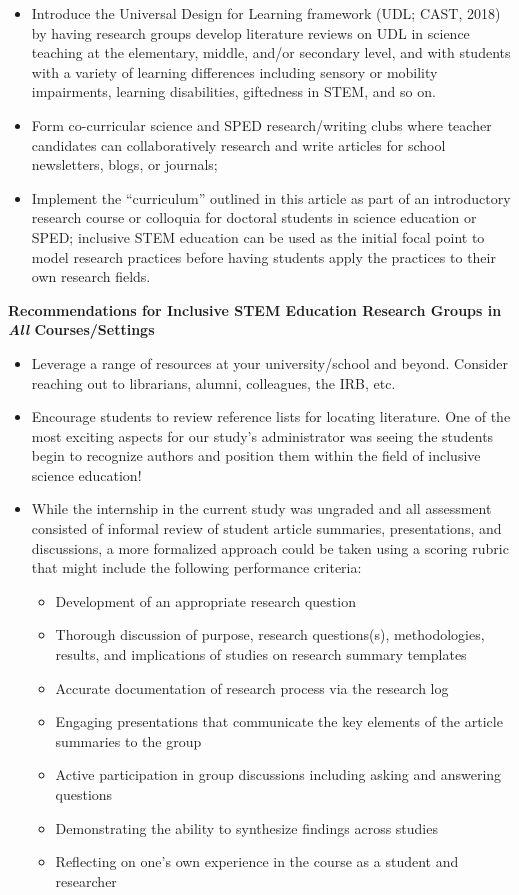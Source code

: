 \documentclass[11.5pt]{sig-alternate}
\begin{document}
\begin{large}
\begin{itemize}
     \item Introduce the Universal Design for Learning framework (UDL; CAST, 2018) by having research groups develop literature reviews on UDL in science teaching at the elementary, middle, and/or secondary level, and with students with a variety of learning differences including sensory or mobility impairments, learning disabilities, giftedness in STEM, and so on.
     \item Form co-curricular science and SPED research/writing clubs where teacher candidates can collaboratively research and write articles for school newsletters, blogs, or journals;
     \item Implement the “curriculum” outlined in this article as part of an introductory research course or colloquia for doctoral students in science education or SPED; inclusive STEM education can be used as the initial focal point to model research practices before having students apply the practices to their own research fields.
 \end{itemize}
 
\textbf{Recommendations for Inclusive STEM Education Research Groups in \textit{All} Courses/Settings}
 \begin{itemize}
     \item Leverage a range of resources at your university/school and beyond.  Consider reaching out to librarians, alumni, colleagues, the IRB, etc.
     \item Encourage students to review reference lists for locating literature. One of the most exciting aspects for our study’s administrator was seeing the students begin to recognize authors and position them within the field of inclusive science education!
     \item While the internship in the current study was ungraded and all assessment consisted of informal review of student article summaries, presentations, and discussions, a more formalized approach could be taken using a scoring rubric that might include the following performance criteria:

      \begin{itemize}[label=$\circ$]
          \item Development of an appropriate research question
          \item Thorough discussion of purpose, research questions(s), methodologies, results, and implications of studies on research summary templates
          \item Accurate documentation of research process via the research log
          \item Engaging presentations that communicate the key elements of the article summaries to the group
          \item Active participation in group discussions including asking and answering questions
          \item Demonstrating the ability to synthesize findings across studies
          \item Reflecting on one’s own experience in the course as a student and researcher
      \end{itemize}


\end{itemize}
\end{large}
\end{document}

